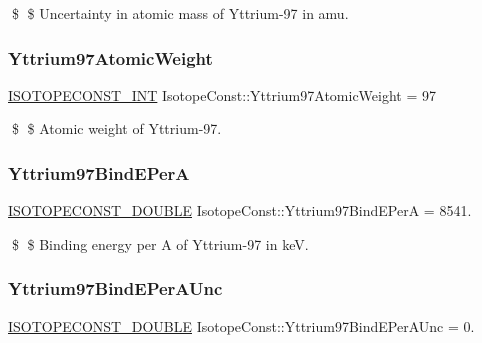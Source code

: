 \$ \$ Uncertainty in atomic mass of Yttrium-\/97 in amu. \mbox{\label{group___isotope_const-_yttrium-_y97_ga0e69c3eb4c0c42708bc4d12d6b08b4b2}} 
\subsubsection{\texorpdfstring{Yttrium97\+Atomic\+Weight}{Yttrium97AtomicWeight}}
{\footnotesize\ttfamily \mbox{\hyperlink{group___isotope_const-_macros_ga5f18360b3e99483a35c32d789e62621c}{I\+S\+O\+T\+O\+P\+E\+C\+O\+N\+S\+T\+\_\+\+I\+NT}} Isotope\+Const\+::\+Yttrium97\+Atomic\+Weight = 97}

\$ \$ Atomic weight of Yttrium-\/97. \mbox{\label{group___isotope_const-_yttrium-_y97_ga2742629797feaf9884694cbbc0b0c9c5}} 
\subsubsection{\texorpdfstring{Yttrium97\+Bind\+E\+PerA}{Yttrium97BindEPerA}}
{\footnotesize\ttfamily \mbox{\hyperlink{group___isotope_const-_macros_ga8f45a7272ce02c0b4c65c44636ed719a}{I\+S\+O\+T\+O\+P\+E\+C\+O\+N\+S\+T\+\_\+\+D\+O\+U\+B\+LE}} Isotope\+Const\+::\+Yttrium97\+Bind\+E\+PerA = 8541.}

\$ \$ Binding energy per A of Yttrium-\/97 in keV. \mbox{\label{group___isotope_const-_yttrium-_y97_gaf18d0558c39f03452ad35c72c9dfee41}} 
\subsubsection{\texorpdfstring{Yttrium97\+Bind\+E\+Per\+A\+Unc}{Yttrium97BindEPerAUnc}}
{\footnotesize\ttfamily \mbox{\hyperlink{group___isotope_const-_macros_ga8f45a7272ce02c0b4c65c44636ed719a}{I\+S\+O\+T\+O\+P\+E\+C\+O\+N\+S\+T\+\_\+\+D\+O\+U\+B\+LE}} Isotope\+Const\+::\+Yttrium97\+Bind\+E\+Per\+A\+Unc = 0.}

